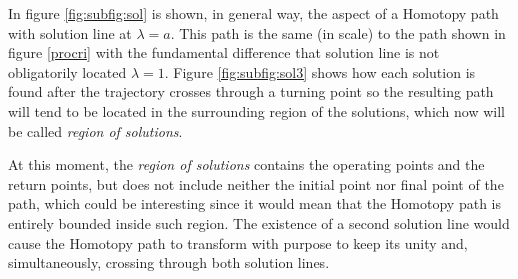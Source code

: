 \documentclass[conference,letterpaper,onecolumn]{IEEEtran}
\begin{document}
In figure \ref{fig:subfig:sol} is shown, in general way, the aspect of a Homotopy path with solution line at $\lambda=a$. This path is the same (in scale) to the path shown in figure \ref{procri} with the fundamental difference that solution line is not obligatorily located $\lambda=1$. Figure \ref{fig:subfig:sol3} shows how each solution is found after the trajectory crosses through a turning point so the resulting path will tend to be located in the surrounding region of the solutions, which now will be called {\it region of solutions}.

At this moment, the {\it region of solutions} contains the operating points and the return points, but does not include neither the initial point nor final point of the path, which could be interesting since it would mean that the Homotopy path is entirely bounded inside such region. The existence of a second solution line would cause the Homotopy path to transform with purpose to keep its unity and, simultaneously, crossing through both solution lines.
\end{document}
